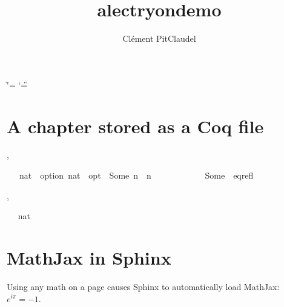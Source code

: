 \documentclass[letterpaper,10pt,english]{sphinxmanual}
\title{alectryon\sphinxhyphen{}demo}
\date{ }
\author{Clément Pit\sphinxhyphen{}Claudel}
\begin{document}
\ifdefined\shorthandoff
  \ifnum\catcode`\=\string=\active\shorthandoff{=}\fi
  \ifnum\catcode`\"=\active{}\fi
\fi

\pagestyle{empty}
\sphinxmaketitle
\pagestyle{plain}
\sphinxtableofcontents
\pagestyle{normal}
\label{\detokenize{index::doc}}


\sphinxstepscope


\chapter{A chapter stored as a Coq file}
\label{\detokenize{coqchapter:a-chapter-stored-as-a-coq-file}}\label{\detokenize{coqchapter::doc}}
\begin{alectryon}
  \sep
  \begin{sentence}
    \begin{input}
      ~~~nat~~option~nat~~opt~~Some~n~~n\nl
      ~~~~~~~~~~~\PYGZus{}~Some~~eq\PYGZus{}refl
    \end{input}
    \sep
    \begin{output}
      \begin{messages}
        \begin{message}
          ~\nl
          ~nat
        \end{message}
      \end{messages}
    \end{output}
  \end{sentence}
\end{alectryon}

\sphinxstepscope


\chapter{MathJax in Sphinx}
\label{\detokenize{math:mathjax-in-sphinx}}\label{\detokenize{math::doc}}
\sphinxAtStartPar
Using any math on a page causes Sphinx to automatically load MathJax: \(e^{i\pi} = -1\).
\end{document}
